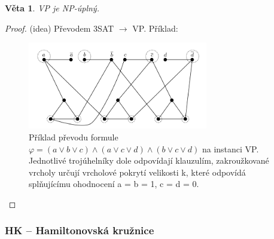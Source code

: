 \documentclass[11pt]{report} %
\newtheorem{theorem}{Věta}[section]
\numberwithin{equation}{section}
\begin{document}
\begin{theorem}
VP je NP-úplný.
\end{theorem}
\begin{proof}(idea)
Převodem 3SAT $\rightarrow$ VP. Příklad:
\begin{figure}[H]
	\centering
	\includegraphics[width=0.7\textwidth]{img/vertexcover.png}
	\caption{Příklad převodu formule $\varphi = (a \vee b \vee c)\wedge(a \vee c \vee d)\wedge(b \vee c \vee d)$ na instanci VP. Jednotlivé trojúhelníky dole odpovídají klauzulím, zakroužkované vrcholy určují vrcholové pokrytí velikosti k, které odpovídá splňujícímu ohodnocení a = b = 1, c = d = 0.}
\end{figure}

\end{proof}


\subsubsection{HK -- Hamiltonovská kružnice}
\begin{minipage}{\textwidth}
	\bigskip
	\centering
	\bigskip
\end{minipage}
\end{document}
